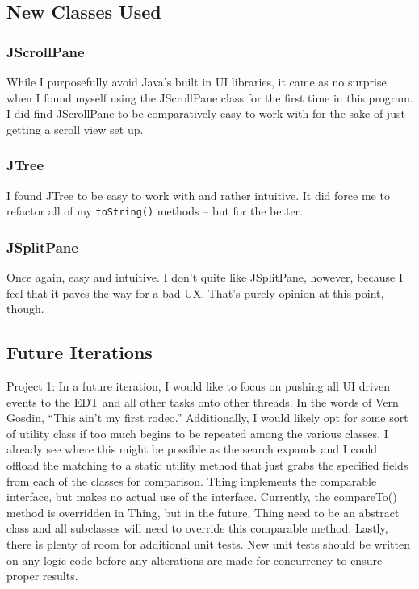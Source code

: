 \documentclass[english,floatsintext,man]{apa6}
\begin{document}
\subsection{New Classes Used}\label{new-classes-used}

\subsubsection{JScrollPane}\label{jscrollpane}

While I purposefully avoid Java's built in UI libraries, it came as no
surprise when I found myself using the JScrollPane class for the first
time in this program. I did find JScrollPane to be comparatively easy to
work with for the sake of just getting a scroll view set up.

\subsubsection{JTree}\label{jtree}

I found JTree to be easy to work with and rather intuitive. It did force
me to refactor all of my \texttt{toString()} methods -- but for the
better.

\subsubsection{JSplitPane}\label{jsplitpane}

Once again, easy and intuitive. I don't quite like JSplitPane, however,
because I feel that it paves the way for a bad UX. That's purely opinion
at this point, though.

\subsection{Future Iterations}\label{future-iterations}

Project 1: In a future iteration, I would like to focus on pushing all
UI driven events to the EDT and all other tasks onto other threads. In
the words of Vern Gosdin, \enquote{This ain't my first rodeo.}
Additionally, I would likely opt for some sort of utility class if too
much begins to be repeated among the various classes. I already see
where this might be possible as the search expands and I could offload
the matching to a static utility method that just grabs the specified
fields from each of the classes for comparison. Thing implements the
comparable interface, but makes no actual use of the interface.
Currently, the compareTo() method is overridden in Thing, but in the
future, Thing need to be an abstract class and all subclasses will need
to override this comparable method. Lastly, there is plenty of room for
additional unit tests. New unit tests should be written on any logic
code before any alterations are made for concurrency to ensure proper
results.
\end{document}
